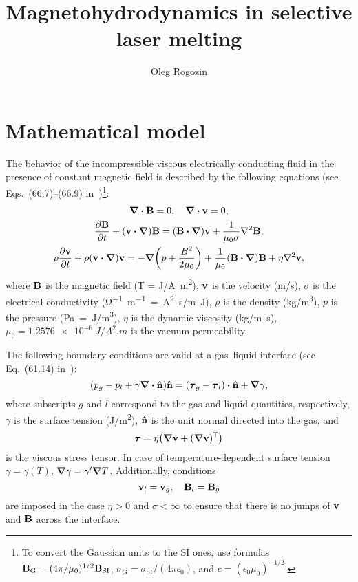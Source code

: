 \documentclass{article}
\title{Magnetohydrodynamics in selective laser melting}
\author{Oleg Rogozin}
\newcommand{\tran}{\mathsf{T}}
\newcommand{\bv}{\vb{v}}
\newcommand{\bn}{\vu{n}}
\newcommand{\bB}{\vb{B}}
\begin{document}
\maketitle
\tableofcontents

\section{Mathematical model}

The behavior of the incompressible viscous electrically conducting fluid in the presence of constant magnetic field is described by the following equations (see Eqs.~(66.7)--(66.9) in~\cite{Landavshits8})\footnote{
    To convert the Gaussian units to the SI ones, use \href{https://en.wikipedia.org/wiki/Gaussian_units\#Electromagnetic_unit_names}{formulas} $\bB_\text{G} = (4\pi/\mu_0)^{1/2}\bB_\text{SI}$, $\sigma_\text{G} = \sigma_\text{SI}/(4\pi\epsilon_0)$, and $c = (\epsilon_0\mu_0)^{-1/2}$.
}:
\begin{gather}
    \div\bB = 0, \quad \div\bv = 0, \label{eq:continuity}\\
    \pdv{\bB}{t} + (\bv\vdot\grad)\bB = (\bB\vdot\grad)\bv + \frac1{\mu_0\sigma}\laplacian\bB, \label{eq:B}\\
    \rho\pdv{\bv}{t} + \rho(\bv\vdot\grad)\bv = -\grad(p+\frac{B^2}{2\mu_0})
        + \frac1{\mu_0}(\bB\vdot\grad)\bB + \eta\laplacian\bv, \label{eq:momentum}
\end{gather}
where $\bB$ is the magnetic field (\si{\tesla} = \si{J/A.m^2}),
$\bv$ is the velocity (\si{m/s}),
$\sigma$ is the electrical conductivity (\si{\ohm^{-1}.m^{-1} = A^2.s/m.J}),
$\rho$ is the density (\si{kg/m^3}), $p$ is the pressure (\si{Pa = J/m^3}),
$\eta$ is the dynamic viscosity (\si{kg/m.s}),
$\mu_0 = \SI{1.2576e-6}{J/A^2.m}$ is the vacuum permeability.

The following boundary conditions are valid at a gas--liquid interface (see Eq.~(61.14) in~\cite{Landavshits6}):
\begin{equation}\label{eq:bc1}
    \qty(p_g - p_l + \gamma\div\bn)\bn = \qty(\vb*\tau_g - \vb*\tau_l)\vdot\bn + \grad\gamma,
\end{equation}
where subscripts $g$ and $l$ correspond to the gas and liquid quantities, respectively,
$\gamma$ is the surface tension (\si{J/m^2}), $\bn$ is the unit normal directed into the gas,
and
\begin{equation}\label{eq:tau}
    \vb*\tau = \eta\qty(\grad\bv + (\grad\bv)^\tran)
\end{equation}
is the viscous stress tensor.
In case of temperature-dependent surface tension $\gamma=\gamma(T)$, $\grad\gamma = \gamma'\grad{T}$.
Additionally, conditions
\begin{equation}\label{eq:bc2}
    \bv_l = \bv_g, \quad \bB_l = \bB_g
\end{equation}
are imposed in the case $\eta>0$ and $\sigma<\infty$ to ensure that there is no jumps of $\bv$ and $\bB$ across the interface.
\end{document}
